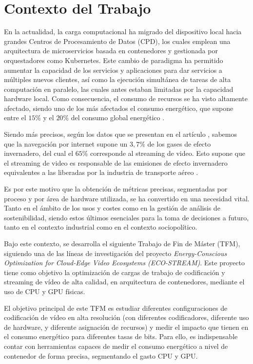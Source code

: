 
\section{Contexto del Trabajo}
En la actualidad, la carga computacional ha migrado del dispositivo local hacia grandes Centros de Procesamiento de Datos (CPD), los cuales emplean una arquitectura de microservicios basada en contenedores y gestionada por orquestadores como Kubernetes. Este cambio de paradigma ha permitido aumentar la capacidad de los servicios y aplicaciones para dar servicios a múltiples nuevos clientes, así como la ejecución simultánea de tareas de alta computación en paralelo, las cuales antes estaban limitadas por la capacidad hardware local. Como consecuencia, el consumo de recursos se ha visto altamente afectado, siendo uno de los más afectados el consumo energético, que supone entre el $15\%$ y el $20\%$ del consumo global energético \cite{ec-cloud-workflows}.

Siendo más precisos, según los datos que se presentan en el artículo \cite{survery-videoencoding}, sabemos que la navegación por internet supone un $3,7\%$ de los gases de efecto invernadero, del cual el $65\%$ corresponde al streaming de video. Esto supone que el streaming de video es responsable de las emisiones de efecto invernadero equivalentes a las liberadas por la industria de transporte aéreo \cite{survery-videoencoding}.

Es por este motivo que la obtención de métricas precisas, segmentadas por proceso y por área de hardware utilizada, se ha convertido en una necesidad vital. Tanto en el ámbito de los usos y costes como en la gestión de análisis de sostenibilidad, siendo estos últimos esenciales para la toma de decisiones a futuro, tanto en el contexto industrial como en el contexto sociopolítico.

Bajo este contexto, se desarrolla el siguiente Trabajo de Fin de Máster (TFM), siguiendo una de las líneas de investigación del proyecto \textit{Energy-Conscious Optimization for Cloud-Edge Video Ecosystems (ECO-STREAM)}. Este proyecto tiene como objetivo la optimización de cargas de trabajo de codificación y streaming de vídeo de alta calidad, en arquitectura de contenedores, mediante el uso de CPU y GPU físicas.

El objetivo principal de este TFM es estudiar diferentes configuraciones de codificación de vídeo en alta resolución (con diferentes codificadores, diferente uso de hardware, y diferente asignación de recursos) y medir el impacto que tienen en el consumo energético para diferentes tasas de bits. Para ello, es indispensable contar con herramientas capaces de medir el consumo energético a nivel de contenedor de forma precisa, segmentando el gasto CPU y GPU.

